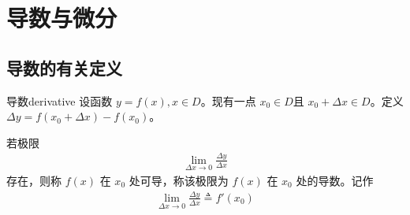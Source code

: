 \chapter{导数与微分}  
\section{导数的有关定义}
\begin{definition}{导数}{derivative}
    设函数 $y=f(x),x\in D$。现有一点 $x_0\in D$且 $x_0+\Delta x \in D$。定义 $\Delta y=f(x_0+\Delta x)-f(x_0)$。

    若极限
    \begin{align}
        \lim_{\Delta x \to 0}\frac{\Delta y}{\Delta x}
    \end{align}
    存在，则称 $f(x)$ 在 $x_0$ 处可导，称该极限为 $f(x)$ 在 $x_0$ 处的导数。记作
    \begin{align}
        \lim_{\Delta x \to 0}\frac{\Delta y}{\Delta x} \triangleq f'(x_0)
    \end{align}
\end{definition}

